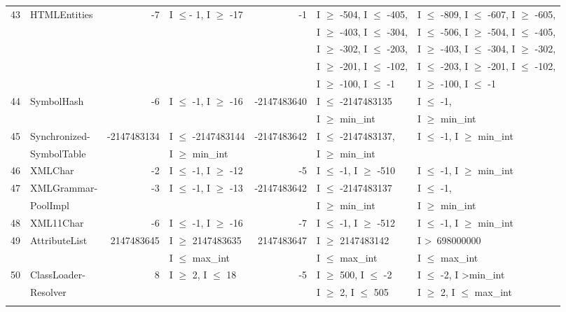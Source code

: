 {\begin{longtable}{|l|l|r|l|r|l|l|}
43	& HTMLEntities				&-7 			& I $\le$- 1, I $\ge$ -17		&-1				& I $\ge$ -504, I $\le$ -405,		& I $\le$ -809, I $\le$ -607, I $\ge$ -605,    	\\ 
	&                         			&				& 							&				& I $\ge$ -403, I $\le$ -304, 		& I $\le$ -506, I $\ge$ -504, I $\le$ -405,		 \\	
	&                         			&				& 							&				& I $\ge$ -302, I $\le$ -203,		& I $\ge$ -403, I $\le$ -304, I $\ge$ -302,	\\	
	&                        				&				& 							&				& I $\ge$ -201, I $\le$ -102, 		& I $\le$ -203, I $\ge$ -201, I $\le$ -102,		 \\	
	&                         			&				& 							&				& I $\ge$ -100, I $\le$ -1			& I $\ge$ -100, I $\le$ -1				 \\	\hline
44	& SymbolHash				&-6 			& I $\le$ -1,  I $\ge$ -16		&-2147483640	& I $\le$ -2147483135			& I $\le$ -1, 							\\ 
	&							&				&							&				& I $\ge$ min\_int				& I $\ge$ min\_int				\\\hline
45	& Synchronized-				&-2147483134	& I $\le$ -2147483144		&-2147483642	& I $\le$ -2147483137,			& I $\le$ -1, I $\ge$ min\_int	\\ 
	& SymbolTable                       	&				& I $\ge$ min\_int			&				& I $\ge$ min\_int	 			&  			   				\\\hline
46	& XMLChar					&-2 			& I $\le$ -1, I $\ge$ -12		&-5 			& I $\le$ -1, I $\ge$ -510			& I $\le$ -1, I $\ge$ min\_int	\\\hline
47	& XMLGrammar- 				&-3 			& I $\le$ -1, I $\ge$ -13		&-2147483642	& I $\le$ -2147483137 			& I $\le$ -1, 							\\ 
	& PoolImpl					&				&							&				& I $\ge$ min\_int				& I $\ge$ min\_int				\\\hline
48	& XML11Char				&-6 			& I $\le$ -1, I $\ge$ -16		&-7 			& I $\le$ -1, I $\ge$ -512			& I $\le$ -1, I $\ge$ min\_int	\\ \hline
49	& AttributeList				&2147483645	& I $\ge$ 2147483635		&2147483647	& I $\ge$ 2147483142			& I \textgreater~698000000					\\ 
	&                                             &				& I $\le$ max\_int			&				& I $\le$ max\_int				& I $\le$ max\_int				\\\hline	
50	& ClassLoader-				&8				& I $\ge$ 2, I $\le$ 18		&-5 			& I $\ge$ 500, I $\le$ -2			& I $\le$ -2, I \textgreater min\_int  	\\ 
	& Resolver					&				& 							&				& I $\ge$ 2, I $\le$ 505			& I $\ge$ 2, I $\le$ max\_int	\\ 
	& \label{table:stripDomains7}	&				&							&				&								&		\\\hline
\end{longtable}
}




